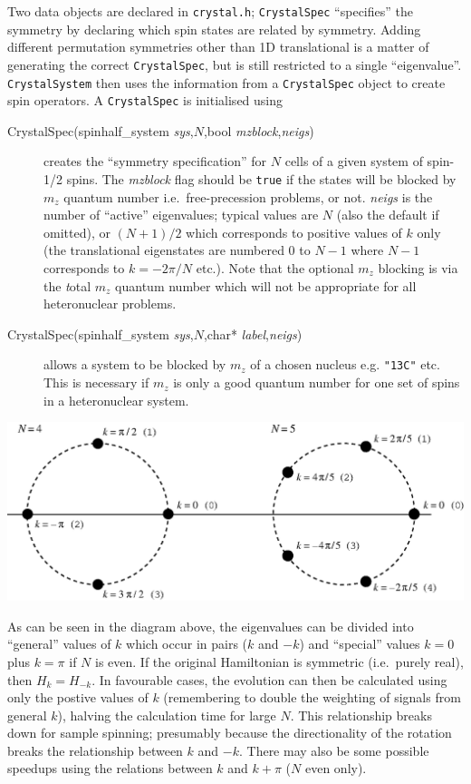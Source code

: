 \documentclass[11pt,a4paper]{article}
\begin{document}
Two data objects are declared in {\tt crystal.h}; {\tt CrystalSpec}
``specifies'' the symmetry by declaring which spin states are
related by symmetry.  Adding different permutation symmetries
other than 1D translational is a matter of generating the correct
{\tt CrystalSpec}, but is still restricted to a single ``eigenvalue''.
{\tt CrystalSystem} then uses the information from a {\tt CrystalSpec} object to
create spin operators.  A {\tt CrystalSpec} is initialised using 
\begin{description}
\item[CrystalSpec(spinhalf\_system {\it sys},$N$,bool {\it mzblock},{\it neigs})] creates 
the ``symmetry specification'' for $N$ cells of a given system of spin-1/2 spins.  The {\it mzblock}
flag should be {\tt true} if the states will be blocked by $m_z$ quantum
number i.e.\ free-precession problems, or not.  {\it neigs} is the number
of ``active'' eigenvalues; typical values are $N$ (also the default if omitted),
or $(N+1)/2$ which corresponds to positive values of $k$ only (the translational
eigenstates are numbered 0 to $N-1$ where $N-1$ corresponds to $k=-2\pi/N$ etc.).
Note that the optional $m_z$ blocking is via the {\emph total} $m_z$ quantum number
which will not be appropriate for all heteronuclear problems. 
\item[CrystalSpec(spinhalf\_system {\it sys},$N$,char* {\it label},{\it neigs})] allows a system
to be blocked by $m_z$ of a chosen nucleus e.g. {\tt "13C"} etc.  This is necessary
if $m_z$ is only a good quantum number for one set of spins in a heteronuclear system.
\end{description}

\begin{center}
\centerline{\includegraphics[width=5.5in]{eigsfig.eps}}
\end{center}

As can be seen in the diagram above, the eigenvalues can be divided
into ``general'' values of $k$ which occur in pairs ($k$ and $-k$)
and ``special'' values $k=0$ plus $k=\pi$ if $N$ is even. 
If the original Hamiltonian is symmetric (i.e.\ purely real),
then $H_{k}=H_{-k}$.  In favourable cases, the evolution can
then be calculated using only the postive values of $k$ 
(remembering to double the weighting of signals from general $k$),
halving the calculation time for large $N$.  This relationship breaks down
for sample spinning; presumably because the directionality of the rotation 
breaks the relationship between $k$ and $-k$.  There may also be some
possible speedups using the relations between $k$ and $k+\pi$ ($N$ even only). 
\end{document}
